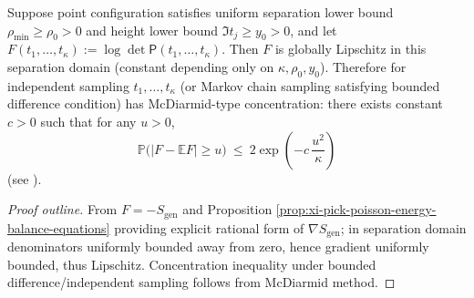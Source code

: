 \begin{proposition}\label{prop:xi-pick-poisson-logdet-concentration}
Suppose point configuration satisfies uniform separation lower bound \(\rho_{\min}\ge\rho_0>0\) and height lower bound \(\Im t_j\ge y_0>0\), and let
\(
F(t_1,\dots,t_\kappa):=\log\det\mathsf P(t_1,\dots,t_\kappa)
\).
Then \(F\) is globally Lipschitz in this separation domain (constant depending only on \(\kappa,\rho_0,y_0\)).
Therefore for independent sampling \(t_1,\dots,t_\kappa\) (or Markov chain sampling satisfying bounded difference condition) has McDiarmid-type concentration: there exists constant \(c>0\) such that for any \(u>0\),
\[
\boxed{\;
\mathbb{P}\bigl(|F-\mathbb{E}F|\ge u\bigr)\ \le\ 2\exp\!\left(-c\,\frac{u^2}{\kappa}\right)\;}
\]
(see \cite{McDiarmid1989BoundedDifferences}).
\end{proposition}
\begin{proof}[Proof outline]
From \(F=-S_{\mathrm{gen}}\) and Proposition \ref{prop:xi-pick-poisson-energy-balance-equations} providing explicit rational form of \(\nabla S_{\mathrm{gen}}\); in separation domain denominators uniformly bounded away from zero, hence gradient uniformly bounded, thus Lipschitz.
Concentration inequality under bounded difference/independent sampling follows from McDiarmid method.
\end{proof}

